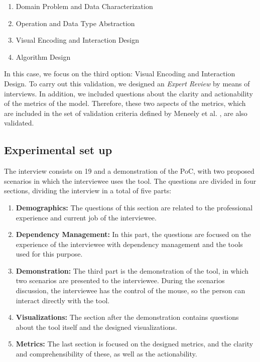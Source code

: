 \begin{enumerate}
  \item Domain Problem and Data Characterization
  \item Operation and Data Type Abstraction
  \item Visual Encoding and Interaction Design
  \item Algorithm Design
\end{enumerate}

In this case, we focus on the third option: Visual Encoding and Interaction Design. To carry out this validation, we designed an \textit{Expert Review} by means of interviews. In addition, we included questions about the clarity and actionability of the metrics of the model. Therefore, these two aspects of the metrics, which are included in the set of validation criteria defined by Meneely et al. \cite{Meneely2012}, are also validated.

\subsection{Experimental set up}
The interview consists on 19 and a demonstration of the PoC, with two proposed scenarios in which the interviewee uses the tool. The questions are divided in four sections, dividing the interview in a total of five parts:

\begin{enumerate}
  \item \textbf{Demographics:} The questions of this section are related to the professional experience and current job of the interviewee.
  \item \textbf{Dependency Management:} In this part, the questions are focused on the experience of the interviewee with dependency management and the tools used for this purpose.
  \item \textbf{Demonstration:} The third part is the demonstration of the tool, in which two scenarios are presented to the interviewee. During the scenarios discussion, the interviewee has the control of the mouse, so the person can interact directly with the tool.
  \item \textbf{Visualizations:} The section after the demonstration contains questions about the tool itself and the designed visualizations.
  \item \textbf{Metrics:} The last section is focused on the designed metrics, and the clarity and comprehensibility of these, as well as the actionability.
\end{enumerate}

